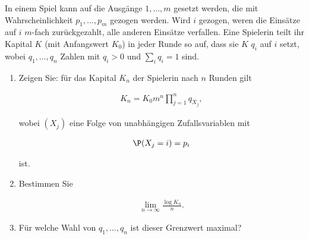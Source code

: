 
\begin{exercise}

In einem Spiel kann auf die Ausgänge $1, \dots, m$ gesetzt werden, die mit Wahrscheinlichkeit $p_1, \dots, p_m$ gezogen werden.
Wird $i$ gezogen, weren die Einsätze auf $i$ $m$-fach zurückgezahlt, alle anderen Einsätze verfallen.
Eine Spielerin teilt ihr Kapital $K$ (mit Anfangswert $K_0$) in jeder Runde so auf, dass sie $K$ $q_i$ auf $i$ setzt, wobei $q_1, \dots, q_n$ Zahlen mit $q_i > 0$ und $\sum_i q_i = 1$ sind.

\begin{enumerate}[label = (\alph*)]

    \item Zeigen Sie:
    für das Kapital $K_n$ der Spielerin nach $n$ Runden gilt

    \begin{align*}
        K_n
        =
        K_0 m^n \prod_{j=1}^n q_{X_j},
    \end{align*}

    wobei $(X_j)$ eine Folge von unabhängigen Zufallsvariablen mit

    \begin{align*}
        \P(X_j = i) = p_i
    \end{align*}

    ist.

    \item Bestimmen Sie
    
    \begin{align*}
        \lim_{n \to \infty}
            \frac{\log K_n}{n}.
    \end{align*}

    \item Für welche Wahl von $q_1, \dots, q_n$ ist dieser Grenzwert maximal?

\end{enumerate}

\end{exercise}


